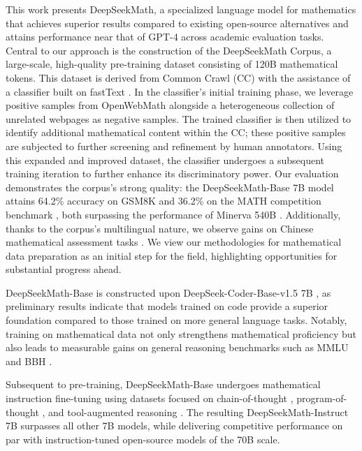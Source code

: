 This work presents DeepSeekMath, a specialized language model for mathematics that achieves superior results compared to existing open-source alternatives and attains performance near that of GPT-4 across academic evaluation tasks. Central to our approach is the construction of the DeepSeekMath Corpus, a large-scale, high-quality pre-training dataset consisting of 120B mathematical tokens. This dataset is derived from Common Crawl (CC) with the assistance of a classifier built on fastText \citep{joulin2016fasttext}. In the classifier’s initial training phase, we leverage positive samples from OpenWebMath \citep{openwebmath} alongside a heterogeneous collection of unrelated webpages as negative samples. The trained classifier is then utilized to identify additional mathematical content within the CC; these positive samples are subjected to further screening and refinement by human annotators. Using this expanded and improved dataset, the classifier undergoes a subsequent training iteration to further enhance its discriminatory power. Our evaluation demonstrates the corpus’s strong quality: the DeepSeekMath-Base 7B model attains 64.2\% accuracy on GSM8K \citep{gsm8k} and 36.2\% on the MATH competition benchmark \citep{MATH}, both surpassing the performance of Minerva 540B \citep{minerva}. Additionally, thanks to the corpus’s multilingual nature, we observe gains on Chinese mathematical assessment tasks \citep{wei2023cmath,agieval}. We view our methodologies for mathematical data preparation as an initial step for the field, highlighting opportunities for substantial progress ahead.

DeepSeekMath-Base is constructed upon DeepSeek-Coder-Base-v1.5 7B \citep{deepseek-coder}, as preliminary results indicate that models trained on code provide a superior foundation compared to those trained on more general language tasks. Notably, training on mathematical data not only strengthens mathematical proficiency but also leads to measurable gains on general reasoning benchmarks such as MMLU \citep{mmlu} and BBH \citep{bbh}.

Subsequent to pre-training, DeepSeekMath-Base undergoes mathematical instruction fine-tuning using datasets focused on chain-of-thought \citep{cot}, program-of-thought \citep{pot,pal}, and tool-augmented reasoning \citep{tora}. The resulting DeepSeekMath-Instruct 7B surpasses all other 7B models, while delivering competitive performance on par with instruction-tuned open-source models of the 70B scale.

